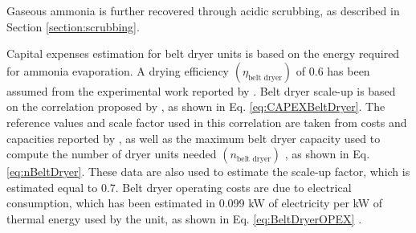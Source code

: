 \begin{refsection}[referencesCh6]

Gaseous ammonia is further recovered through acidic scrubbing, as described in Section \ref{section:scrubbing}. 

Capital expenses estimation for belt dryer units is based on the energy required for ammonia evaporation.
A drying efficiency $\left(\eta_{\text{belt dryer}}\right)$ of 0.6 has been assumed from the experimental work reported by \citet{awiszus2018utilization}. Belt dryer scale-up is based on the correlation proposed by \citet{towler2012chemical}, as shown in Eq. \ref{eq:CAPEXBeltDryer}. The reference values and scale factor used in this correlation are taken from costs and capacities reported by \citet{turley2016assessment}, as well as the maximum belt dryer capacity used to compute the number of dryer units needed $\left(n_{\text{belt dryer}} \right)$ , as shown in Eq. \ref{eq:nBeltDryer}. These data are also used to estimate the scale-up factor, which is estimated equal to 0.7. Belt dryer operating costs are due to electrical consumption, which has been estimated in 0.099 kW of electricity per kW of thermal energy used by the unit, as shown in Eq. \ref{eq:BeltDryerOPEX} \citep{awiszus2018utilization}.


\end{refsection}
